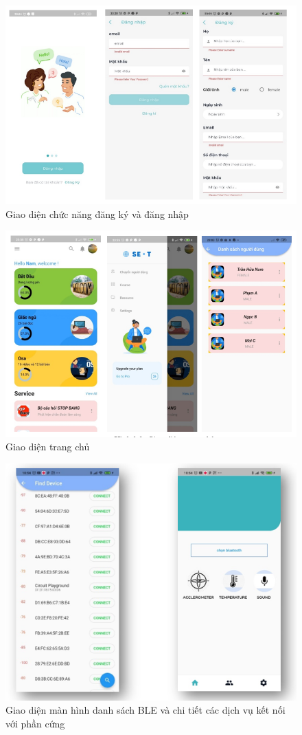 \begin{figure}[htbp]
    \centering
    \includegraphics[width=0.8\linewidth]{images/appAuth.png}
    \caption{Giao diện chức năng đăng ký và đăng nhập}
    \label{appAuth}
\end{figure}

\begin{figure}[h!]
    \centering
    \includegraphics[width=0.8\linewidth]{images/app_cate.png}
    \caption{Giao diện trang chủ}
    \label{app_cate}
\end{figure}


\begin{figure}[htbp]
    \centering
    \includegraphics[width=0.5\linewidth]{images/app_ble.png}
    \caption{Giao diện màn hình danh sách BLE và chi tiết các dịch vụ kết nối với phần cứng}
    \label{listble}
\end{figure}

